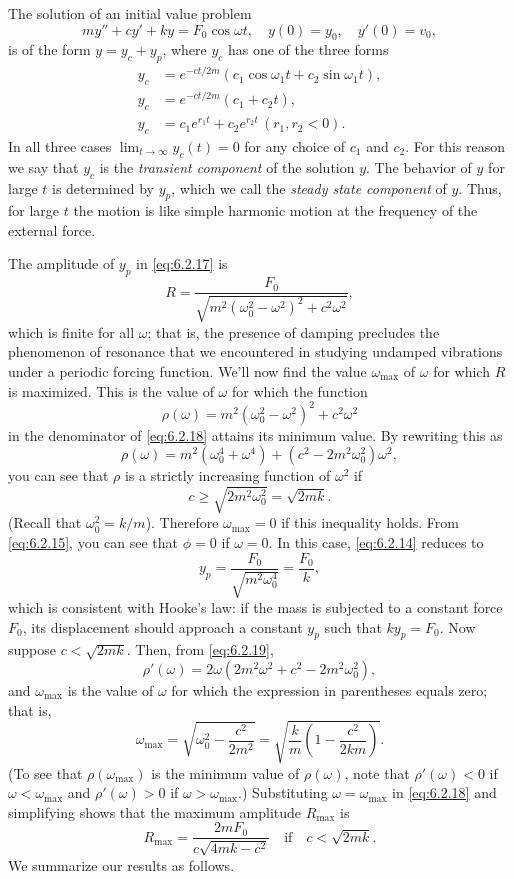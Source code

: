 The solution of an initial value problem
\[
my''+cy'+ky=F_0\cos\omega t, \quad  y(0)=y_0,\quad y'(0)=v_0,
\]
is of the form $y=y_c+y_p$,
where  $y_c$ has one of the three forms
\begin{align*}
y_c&=e^{-ct/2m}(c_1\cos\omega_1t+c_2\sin\omega_1t),\\
y_c&=e^{-ct/2m}(c_1+c_2t),\\
y_c&=c_1e^{r_1t}+c_2e^{r_2t}\,(r_1,r_2<0).
\end{align*}
In all three cases $\lim_{t\to\infty} y_c(t)=0$ for any choice of
$c_1$ and $c_2$. For this reason we say that $y_c$ is the
\emph{\color{blue}transient component} of the solution $y$.
The behavior of $y$ for
large $t$ is determined by $y_p$, which we call the \emph{\color{blue}steady state
component} of $y$. Thus, for large $t$ the motion is like simple
harmonic motion at the frequency of the external force.

The amplitude of $y_p$ in \eqref{eq:6.2.17} is
\begin{equation}\label{eq:6.2.18}
R=\frac{F_0}{\sqrt{m^2(\omega^2_0-\omega^2)^2+c^2\omega^2}},
\end{equation}
which is finite for all $\omega$; that is, the presence of damping
precludes the phenomenon of resonance that we encountered in studying
undamped vibrations under a periodic forcing function. We'll now
find the value $\omega_{\max}$ of $\omega$ for which $R$ is maximized.
This is the value of $\omega$ for which the function
\[
\rho (\omega)=m^2(\omega^2_0-\omega^2)^2+c^2\omega^2
\]
in the denominator of  \eqref{eq:6.2.18} attains its minimum value.  By
rewriting this as
\begin{equation}\label{eq:6.2.19}
\rho (\omega)=m^2(\omega^4_0+\omega^4)+
 (c^2-2m^2\omega^2_0)\omega^2,
\end{equation}
 you can see that $\rho$ is a strictly
increasing function of $\omega^2$ if
\[
c\ge\sqrt{2m^2\omega^2_0}=\sqrt{2mk}.
\]
(Recall that $\omega^2_0=k/m$). Therefore $\omega_{\max}=0$ if this
inequality holds. From \eqref{eq:6.2.15}, you can see that $\phi=0$ if
$\omega=0$. In this case, \eqref{eq:6.2.14} reduces to
\[
y_p=\frac{F_0}{\sqrt{m^2\omega^4_0}}=\frac{F_0}{k},
\]
which is consistent with Hooke's law: if the mass is subjected to a
constant force $F_0$,  its displacement should approach a constant
$y_p$ such that $ky_p=F_0$. Now suppose   $c<\sqrt{2mk}$. Then,
from \eqref{eq:6.2.19},
\[
\rho'(\omega)=2\omega(2m^2\omega^2+c^2-2m^2\omega^2_0),
\]
and $\omega_{\max}$ is the value of $\omega$ for which the
expression in parentheses equals zero; that is,
\[
\omega_{\max}=\sqrt{\omega^2_0-\frac{c^2}{2m^2}}
=\sqrt{\frac{k}{m}\left(1-\frac{c^2}{2km}\right)}.
\]
(To see that $\rho(\omega_{\max})$ is the minimum value of
$\rho(\omega)$, note that $\rho'(\omega)<0$ if $\omega
<\omega_{\max}$ and $\rho'(\omega)>0$ if $\omega>\omega_{\max}$.)
Substituting $\omega=\omega_{\max}$ in \eqref{eq:6.2.18} and simplifying
shows that the maximum amplitude $R_{\max}$ is
\[
R_{\max}=\frac{2mF_0}{c\sqrt{4mk-c^2}} \quad\text{if}\quad c<\sqrt{2mk}.
\]
We summarize our results  as follows.


